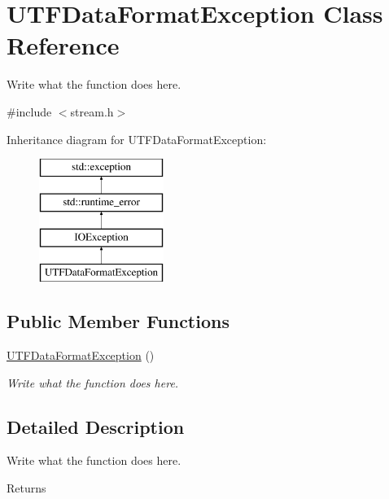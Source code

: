 \hypertarget{classUTFDataFormatException}{\section{U\+T\+F\+Data\+Format\+Exception Class Reference}
\label{classUTFDataFormatException}
}


Write what the function does here.  




{\ttfamily \#include $<$stream.\+h$>$}

Inheritance diagram for U\+T\+F\+Data\+Format\+Exception\+:\begin{figure}[H]
\begin{center}
\leavevmode
\includegraphics[height=4.000000cm]{classUTFDataFormatException}
\end{center}
\end{figure}
\subsection*{Public Member Functions}
\begin{DoxyCompactItemize}
\item 
\hyperlink{classUTFDataFormatException_aa36bebb99dcca0e2fa9fe478f3e68b86}{U\+T\+F\+Data\+Format\+Exception} ()
\begin{DoxyCompactList}\small\item\em Write what the function does here. \end{DoxyCompactList}\end{DoxyCompactItemize}


\subsection{Detailed Description}
Write what the function does here. 

\begin{DoxyReturn}{Returns}

\end{DoxyReturn}


